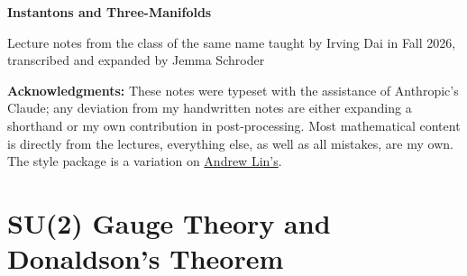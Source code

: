 \documentclass[11pt]{article}
\begin{document}
\begin{titlepage}
\begin{center}
\vspace*{2cm}
{\LARGE\bfseries Instantons and Three-Manifolds\par}
\vspace{2em}
{\large Lecture notes from the class of the same name taught by Irving Dai in Fall 2026, transcribed and expanded by Jemma Schroder\par}
\vspace{1.5em}
\begin{minipage}{0.8\textwidth}
\small
\textbf{Acknowledgments:} These notes were typeset with the assistance of Anthropic's Claude; any deviation from my handwritten notes are either expanding a shorthand or my own contribution in post-processing. Most mathematical content is directly from the lectures, everything else, as well as all mistakes, are my own. The style package is a variation on \href{https://web.stanford.edu/~lindrew/}{Andrew Lin's}.
\end{minipage}
\end{center}
\vspace{2em}
\begingroup
\sffamily
\hypersetup{linkcolor=black}
\tableofcontents
\endgroup
\end{titlepage}

\pagestyle{fancy}
\fancyhf{}
\fancyfoot[C]{\thepage}
\renewcommand{\headrulewidth}{0pt}
\renewcommand{\footrulewidth}{0pt}
\setlength{\headheight}{14.5pt}

\part{SU(2) Gauge Theory and Donaldson's Theorem}
\clearpage{}\thispagestyle{plain}
\clearpage{}\thispagestyle{plain}
\clearpage{}\thispagestyle{plain}
\clearpage{}\thispagestyle{plain}
\clearpage{}\thispagestyle{plain}
\end{document}
